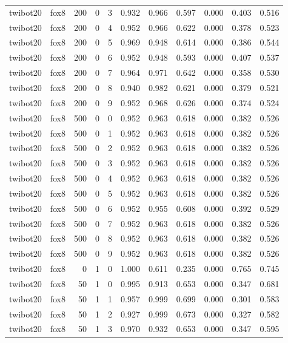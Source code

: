 \begin{tabular}{llrrrrrrrrr}
twibot20 & fox8 & 200 & 0 & 3 & 0.932 & 0.966 & 0.597 & 0.000 & 0.403 & 0.516 \\
twibot20 & fox8 & 200 & 0 & 4 & 0.952 & 0.966 & 0.622 & 0.000 & 0.378 & 0.523 \\
twibot20 & fox8 & 200 & 0 & 5 & 0.969 & 0.948 & 0.614 & 0.000 & 0.386 & 0.544 \\
twibot20 & fox8 & 200 & 0 & 6 & 0.952 & 0.948 & 0.593 & 0.000 & 0.407 & 0.537 \\
twibot20 & fox8 & 200 & 0 & 7 & 0.964 & 0.971 & 0.642 & 0.000 & 0.358 & 0.530 \\
twibot20 & fox8 & 200 & 0 & 8 & 0.940 & 0.982 & 0.621 & 0.000 & 0.379 & 0.521 \\
twibot20 & fox8 & 200 & 0 & 9 & 0.952 & 0.968 & 0.626 & 0.000 & 0.374 & 0.524 \\
twibot20 & fox8 & 500 & 0 & 0 & 0.952 & 0.963 & 0.618 & 0.000 & 0.382 & 0.526 \\
twibot20 & fox8 & 500 & 0 & 1 & 0.952 & 0.963 & 0.618 & 0.000 & 0.382 & 0.526 \\
twibot20 & fox8 & 500 & 0 & 2 & 0.952 & 0.963 & 0.618 & 0.000 & 0.382 & 0.526 \\
twibot20 & fox8 & 500 & 0 & 3 & 0.952 & 0.963 & 0.618 & 0.000 & 0.382 & 0.526 \\
twibot20 & fox8 & 500 & 0 & 4 & 0.952 & 0.963 & 0.618 & 0.000 & 0.382 & 0.526 \\
twibot20 & fox8 & 500 & 0 & 5 & 0.952 & 0.963 & 0.618 & 0.000 & 0.382 & 0.526 \\
twibot20 & fox8 & 500 & 0 & 6 & 0.952 & 0.955 & 0.608 & 0.000 & 0.392 & 0.529 \\
twibot20 & fox8 & 500 & 0 & 7 & 0.952 & 0.963 & 0.618 & 0.000 & 0.382 & 0.526 \\
twibot20 & fox8 & 500 & 0 & 8 & 0.952 & 0.963 & 0.618 & 0.000 & 0.382 & 0.526 \\
twibot20 & fox8 & 500 & 0 & 9 & 0.952 & 0.963 & 0.618 & 0.000 & 0.382 & 0.526 \\
twibot20 & fox8 & 0 & 1 & 0 & 1.000 & 0.611 & 0.235 & 0.000 & 0.765 & 0.745 \\
twibot20 & fox8 & 50 & 1 & 0 & 0.995 & 0.913 & 0.653 & 0.000 & 0.347 & 0.681 \\
twibot20 & fox8 & 50 & 1 & 1 & 0.957 & 0.999 & 0.699 & 0.000 & 0.301 & 0.583 \\
twibot20 & fox8 & 50 & 1 & 2 & 0.927 & 0.999 & 0.673 & 0.000 & 0.327 & 0.582 \\
twibot20 & fox8 & 50 & 1 & 3 & 0.970 & 0.932 & 0.653 & 0.000 & 0.347 & 0.595 \\

\end{tabular}
